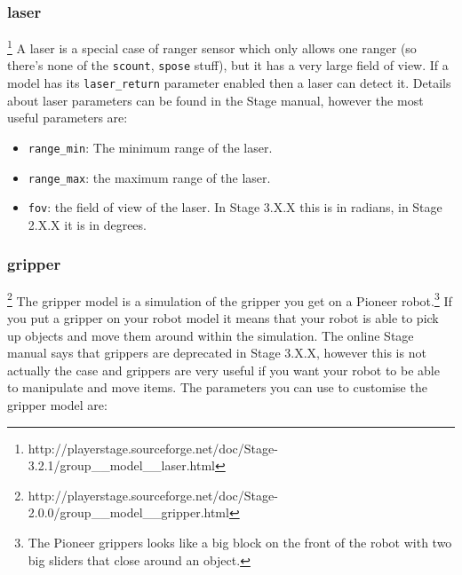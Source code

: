 \documentclass[a4paper]{report}
\begin{document}
\subsubsection{laser}\footnote{http://playerstage.sourceforge.net/doc/Stage-3.2.1/group\_\_model\_\_laser.html}
A laser is a special case of ranger sensor which only allows one ranger (so there's none of the \verb|scount|, \verb|spose| stuff), but it has a very large field of view. If a model has its \verb|laser_return| parameter enabled then a laser can detect it. Details about laser parameters can be found in the Stage manual, however the most useful parameters are:
\begin{itemize}
\item \verb|range_min|: The minimum range of the laser.
\item \verb|range_max|: the maximum range of the laser.
\item \verb|fov|: the field of view of the laser. In Stage 3.X.X this is in radians, in Stage 2.X.X it is in degrees.
\end{itemize}

\subsubsection{gripper}\footnote{http://playerstage.sourceforge.net/doc/Stage-2.0.0/group\_\_model\_\_gripper.html}\label{sec:gripper}
The gripper model is a simulation of the gripper you get on a Pioneer robot.\footnote{The Pioneer grippers looks like a big block on the front of the robot with two big sliders that close around an object.} If you put a gripper on your robot model it means that your robot is able to pick up objects and move them around within the simulation. The online Stage manual says that grippers are deprecated in Stage 3.X.X, however this is not actually the case and grippers are very useful if you want your robot to be able to manipulate and move items. The parameters you can use to customise the gripper model are:
\end{document}
